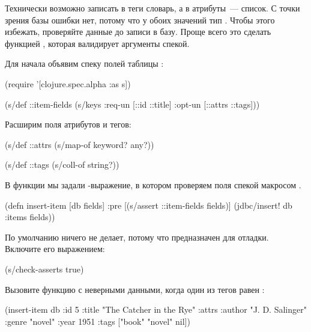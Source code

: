 Технически возможно записать в теги словарь, а в атрибуты~--- список. С точки зрения базы ошибки нет, потому что у обоих значений тип . Чтобы этого избежать, проверяйте данные до записи в базу. Проще всего это сделать функцией , которая валидирует аргументы спекой.

Для начала объявим спеку полей таблицы :

\begin{english}
  \begin{clojure}
(require '[clojure.spec.alpha :as s])

(s/def ::item-fields
  (s/keys :req-un [::id ::title]
          :opt-un [::attrs ::tags]))
  \end{clojure}
\end{english}

Расширим поля атрибутов и тегов:


\begin{english}
  \begin{clojure}
(s/def ::attrs
  (s/map-of keyword? any?))

(s/def ::tags
  (s/coll-of string?))
  \end{clojure}
\end{english}

В функции  мы задали -выражение, в котором проверяем поля спекой макросом  .

\begin{english}
  \begin{clojure/lines}
(defn insert-item [db fields]
  {:pre [(s/assert ::item-fields fields)]}
  (jdbc/insert! db :items fields))
  \end{clojure/lines}
\end{english}


По умолчанию  ничего не делает, потому что предназначен для отладки. Включите его выражением:

\begin{english}
  \begin{clojure}
(s/check-asserts true)
  \end{clojure}
\end{english}

Вызовите функцию с неверными данными, когда один из тегов равен  :

\begin{english}
  \begin{clojure/lines}
(insert-item db {:id 5
                 :title "The Catcher in the Rye"
                 :attrs {:author "J. D. Salinger"
                         :genre "novel"
                         :year 1951}
                 :tags ["book" "novel" nil]})
  \end{clojure/lines}
\end{english}

